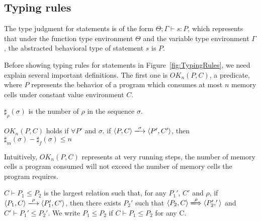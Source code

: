 \subsection{Typing rules}
The type judgment for statements is of the form \(\Theta; \Gamma
\vdash s : P \), which represents that under the function type
environment \(\Theta\) and the variable type environment \(\Gamma\),
the abstracted behavioral type of statement \(s\) is \(P\).

Before showing typing rules for statements in
Figure~\ref{fig:TypingRules}, we need explain several important
definitions. The first one is \(OK_n(P, C)\), a predicate, where \(P\)
represents the behavior of a program which consumes at most \(n\)
memory cells under constant value environment \(C\).

\begin{myDef}[\(\sharp_{\rho}(\sigma)\)]
\label{df:sharf}
\(\sharp_{\rho}(\sigma)\) is the number of \(\rho\) in the sequence
\(\sigma\).
\end{myDef}



\begin{myDef}
\label{df:okn}
\(OK_{n}(P, C)\) holds if \( \forall P'\) and \(\sigma\). if \( \langle P, C \rangle
\xlongrightarrow{\sigma} \langle P', C' \rangle \), then \( \sharp_m(\sigma) - \sharp_f(\sigma) \le n\)
\end{myDef}


Intuitively, \(OK_n(P, C)\) represents at very running steps, the
number of memory cells a program consumed will not exceed the number
of memory cells the program requires.

\begin{myDef}[Subtyping]
\( C\vdash P_1 \le P_2\) is the largest relation such that, for any
\(P_1'\), \(C'\) and \(\rho\), if \( \langle P_1, C \rangle
\xlongrightarrow{\rho} \langle P_1', C' \rangle \), then there exists
\(P_2'\) such that \( \langle P_2, C \rangle \xLongrightarrow{\rho}
\langle P_2', ' \rangle \) and \( C'\vdash P_1' \le P_2'\).  We write
\( P_1 \le P_2\) if \(C\vdash P_1 \le P_2\) for any C.
\label{df:subtype}
\end{myDef}

